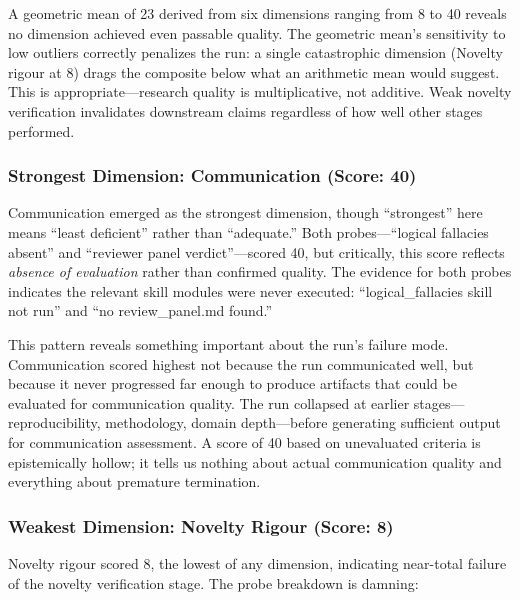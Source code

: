 \documentclass[10pt,letterpaper]{article}
\begin{document}
A geometric mean of 23 derived from six dimensions ranging from 8 to 40 reveals no dimension achieved even passable quality. The geometric mean's sensitivity to low outliers correctly penalizes the run: a single catastrophic dimension (Novelty rigour at 8) drags the composite below what an arithmetic mean would suggest. This is appropriate---research quality is multiplicative, not additive. Weak novelty verification invalidates downstream claims regardless of how well other stages performed.

\hypertarget{strongest-dimension-communication-score-40}{%
\subsubsection{Strongest Dimension: Communication (Score: 40)}\label{strongest-dimension-communication-score-40}}

Communication emerged as the strongest dimension, though ``strongest'' here means ``least deficient'' rather than ``adequate.'' Both probes---``logical fallacies absent'' and ``reviewer panel verdict''---scored 40, but critically, this score reflects \emph{absence of evaluation} rather than confirmed quality. The evidence for both probes indicates the relevant skill modules were never executed: ``logical\_fallacies skill not run'' and ``no review\_panel.md found.''

This pattern reveals something important about the run's failure mode. Communication scored highest not because the run communicated well, but because it never progressed far enough to produce artifacts that could be evaluated for communication quality. The run collapsed at earlier stages---reproducibility, methodology, domain depth---before generating sufficient output for communication assessment. A score of 40 based on unevaluated criteria is epistemically hollow; it tells us nothing about actual communication quality and everything about premature termination.

\hypertarget{weakest-dimension-novelty-rigour-score-8}{%
\subsubsection{Weakest Dimension: Novelty Rigour (Score: 8)}\label{weakest-dimension-novelty-rigour-score-8}}

Novelty rigour scored 8, the lowest of any dimension, indicating near-total failure of the novelty verification stage. The probe breakdown is damning:
\end{document}
